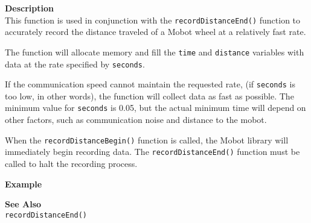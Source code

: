 \noindent
{\bf Description}\\
This function is used in conjunction with the \texttt{recordDistanceEnd()}
function to accurately record the distance traveled of a Mobot wheel at a relatively fast
rate. 

The function will allocate memory and fill the \texttt{time} and \texttt{distance} variables with data
at the rate specified by \texttt{seconds}. 

If the communication speed cannot maintain 
the requested rate, (if \texttt{seconds} is too low, in other words), the function will
collect data as fast as possible. The minimum value for \texttt{seconds} is 0.05, but
the actual minimum time will depend on other factors, such as communication noise and
distance to the mobot.

When the \texttt{recordDistanceBegin()} function is called, the Mobot library will 
immediately begin recording data. The \texttt{recordDistanceEnd()} function
must be called to halt the recording process. 

\noindent
{\bf Example}\\
\noindent

\noindent
{\bf See Also}\\
\texttt{recordDistanceEnd()} \\
